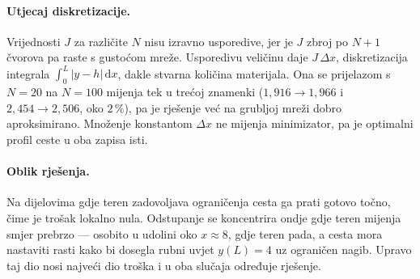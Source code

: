 \paragraph{Utjecaj diskretizacije.} Vrijednosti $J$ za različite $N$ nisu
izravno usporedive, jer je $J$ zbroj po $N+1$ čvorova pa raste s gustoćom mreže.
Usporedivu veličinu daje $J\,\Delta x$, diskretizacija integrala
$\int_0^L |y-h|\,\mathrm{d}x$, dakle stvarna količina materijala. Ona se
prijelazom s $N=20$ na $N=100$ mijenja tek u trećoj znamenki
($1{,}916 \to 1{,}966$ i $2{,}454 \to 2{,}506$, oko $2\,\%$), pa je rješenje već
na grubljoj mreži dobro aproksimirano. Množenje konstantom $\Delta x$ ne mijenja
minimizator, pa je optimalni profil ceste u oba zapisa isti.

\paragraph{Oblik rješenja.} Na dijelovima gdje teren zadovoljava ograničenja
cesta ga prati gotovo točno, čime je trošak lokalno nula. Odstupanje se
koncentrira ondje gdje teren mijenja smjer prebrzo --- osobito u udolini oko
$x \approx 8$, gdje teren pada, a cesta mora nastaviti rasti kako bi dosegla
rubni uvjet $y(L) = 4$ uz ograničen nagib. Upravo taj dio nosi najveći dio
troška i u oba slučaja određuje rješenje.
